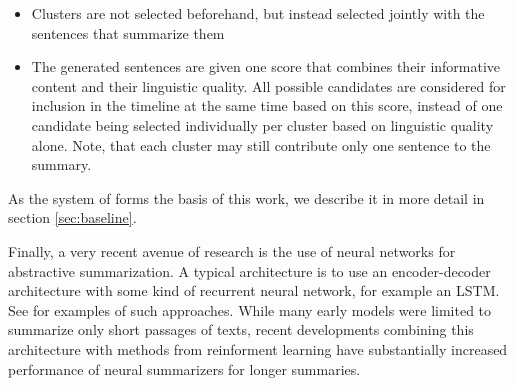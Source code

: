 \documentclass[a4paper,BCOR=10mm]{report}
\numberwithin{lemma}{chapter}
\numberwithin{definition}{chapter}
\begin{document}
\begin{itemize}
    \item{Clusters are not selected beforehand, but instead selected jointly with the sentences that summarize them}
    \item{The generated sentences are given one score that combines their informative content and their linguistic quality. All possible candidates are considered for inclusion in the timeline at the same time based on this score, instead of one candidate being selected individually per cluster based on linguistic quality alone. Note, that each cluster may still contribute only one sentence to the summary.}
\end{itemize}

As the system of \citet{banerjee} forms the basis of this work, we describe it in more detail in section \ref{sec:baseline}.



%


Finally, a very recent avenue of research is the use of neural networks for abstractive summarization. A typical architecture is to use an encoder-decoder architecture with some kind of recurrent neural network, for example an LSTM. See \citet{nallapati, rush} for examples of such approaches.
While many early models were limited to summarize only short passages of texts, recent developments combining this architecture with methods from reinforment learning have substantially increased performance of neural summarizers for longer summaries. \citep{paulus}
\end{document}
